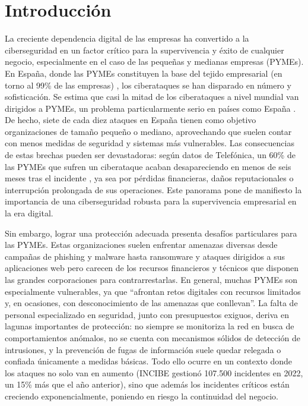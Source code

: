 \documentclass[11pt,a4paper,twoside]{report}
\begin{document}
\cleardoublepage
\chapter*{Introducción}
\setcounter{secnumdepth}{0} %

La creciente dependencia digital de las empresas ha convertido a la ciberseguridad en un factor crítico para la supervivencia y éxito de cualquier negocio, especialmente en el caso de las pequeñas y medianas empresas (PYMEs). En España, donde las PYMEs constituyen la base del tejido empresarial (en torno al 99\% de las empresas) \cite{enisa2023}
, los ciberataques se han disparado en número y sofisticación. Se estima que casi la mitad de los ciberataques a nivel mundial van dirigidos a PYMEs, un problema particularmente serio en países como España \cite{google2024}. De hecho, siete de cada diez ataques en España tienen como objetivo organizaciones de tamaño pequeño o mediano, aprovechando que suelen contar con menos medidas de seguridad y sistemas más vulnerables. Las consecuencias de estas brechas pueden ser devastadoras: según datos de Telefónica, un 60\% de las PYMEs que sufren un ciberataque acaban desapareciendo en menos de seis meses tras el incidente \cite{telefonica2023}, ya sea por pérdidas financieras, daños reputacionales o interrupción prolongada de sus operaciones. Este panorama pone de manifiesto la importancia de una ciberseguridad robusta para la supervivencia empresarial en la era digital.\newline

Sin embargo, lograr una protección adecuada presenta desafíos particulares para las PYMEs. Estas organizaciones suelen enfrentar amenazas diversas desde campañas de phishing y malware hasta ransomware y ataques dirigidos a sus aplicaciones web pero carecen de los recursos financieros y técnicos que disponen las grandes corporaciones para contrarrestarlas. En general, muchas PYMEs son especialmente vulnerables, ya que “afrontan retos digitales con recursos limitados y, en ocasiones, con desconocimiento de las amenazas que conllevan”. La falta de personal especializado en seguridad, junto con presupuestos exiguos, deriva en lagunas importantes de protección: no siempre se monitoriza la red en busca de comportamientos anómalos, no se cuenta con mecanismos sólidos de detección de intrusiones, y la prevención de fugas de información suele quedar relegada o confiada únicamente a medidas básicas. Todo ello ocurre en un contexto donde los ataques no solo van en aumento (INCIBE gestionó 107.500 incidentes en 2022, un 15\% más que el año anterior), sino que además los incidentes críticos están creciendo exponencialmente, poniendo en riesgo la continuidad del negocio.\newline
\end{document}
